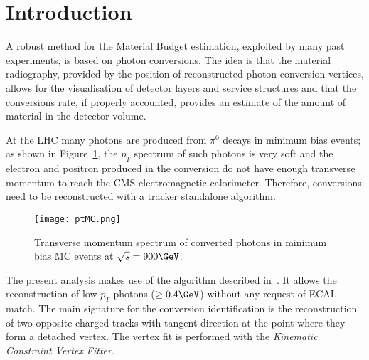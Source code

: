 \section{Introduction}
\label{introductions}

A robust method for the Material Budget estimation, exploited by many
past experiments, is based on photon conversions. The idea is that the
material radiography, provided by the position of reconstructed photon
conversion vertices, allows for the visualisation of detector layers
and service structures and that the conversions rate, if properly
accounted, provides an estimate of the amount of material in the
detector volume.

At the LHC many photons are produced from $\pi^0$ decays in minimum bias events; 
as shown in Figure~\ref{ptMC}, the $p_T$ spectrum of such photons is
very soft and the electron and positron produced in the conversion 
do not have enough transverse momentum to reach the CMS electromagnetic calorimeter.
Therefore, conversions need to be reconstructed with a tracker standalone algorithm.

\begin{figure}[!hbtp]
\centering
\texttt{[image: ptMC.png]}
\caption{Transverse momentum spectrum of converted photons in minimum
  bias MC events at $\sqrt{s}=900\GeV$.}
\label{ptMC}
\end{figure}

The present analysis makes use of the algorithm described in~\cite{nancy}.
It allows the reconstruction of low-$p_T$ photons ($\geq 0.4\GeV$)
without any request of ECAL match. The main signature for the
conversion identification is the reconstruction of two opposite
charged tracks with tangent direction at the point where they form a
detached vertex. The vertex fit is performed with the \emph{Kinematic
  Constraint Vertex Fitter}.



